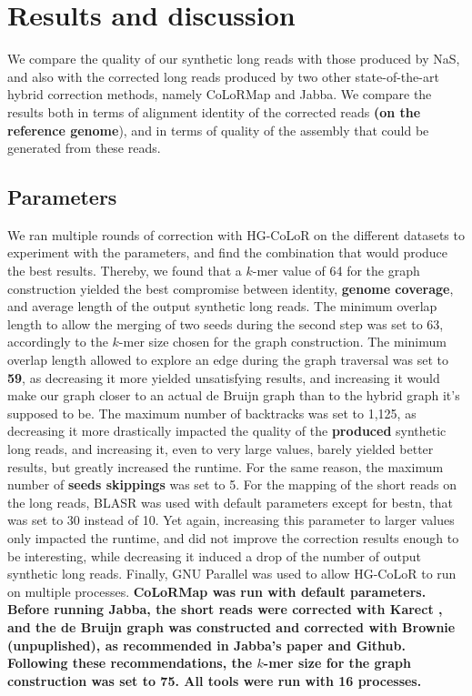 \documentclass[long, final]{jobim2017}
\begin{document}
\section{Results and discussion}
\label{sec:results}

We compare the quality of our synthetic long reads with those produced by NaS, and also with the corrected long reads produced by two other state-of-the-art hybrid correction methods, namely CoLoRMap and Jabba. We compare the results both in terms of alignment identity of the corrected reads \textbf{(on the reference genome}), and in terms of quality of the assembly that could be generated from these reads.

\subsection{Parameters}

We ran multiple rounds of correction with HG-CoLoR on the different datasets to experiment with the parameters, and find the combination that would produce the best results. Thereby, we found that a $k$-mer value of 64 for the graph construction yielded the best compromise between identity, \textbf{genome coverage}, and average length of the output synthetic long reads. The minimum overlap length to allow the merging of two seeds during the second step was set to 63, accordingly to the $k$-mer size chosen for the graph construction. The minimum overlap length allowed to explore an edge during the graph traversal was set to \textbf{59}, as decreasing it more yielded unsatisfying results, and increasing it would make our graph closer to an actual de Bruijn graph than to the hybrid graph it's supposed to be. The maximum number of backtracks was set to 1,125, as decreasing it more drastically impacted the quality of the \textbf{produced} synthetic long reads, and increasing it, even to very large values, barely yielded better results, but greatly increased the runtime. For the same reason, the maximum number of \textbf{seeds skippings} was set to 5. For the mapping of the short reads on the long reads, BLASR was used with default parameters except for bestn, that was set to 30 instead of 10. Yet again, increasing this parameter to larger values only impacted the runtime, and did not improve the correction results enough to be interesting, while decreasing it induced a drop of the number of output synthetic long reads. Finally, GNU Parallel \cite{Tange2011} was used to allow HG-CoLoR to run on multiple processes. \textbf{CoLoRMap was run with default parameters. Before running Jabba, the short reads were corrected with Karect \cite{Allam2015}, and the de Bruijn graph was constructed and corrected with Brownie (\textbf{unpuplished}), as recommended in Jabba's paper and Github. Following these recommendations, the $k$-mer size for the graph construction was set to 75. All tools were run with 16 processes.}
\end{document}
